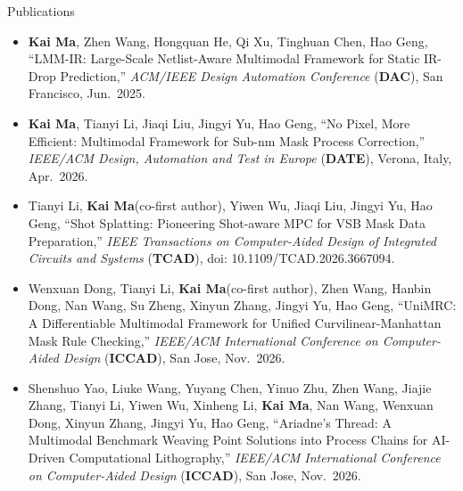 \documentclass{resume}
\begin{document}
\begin{rSection}{Publications}
\vspace{0.3em}

\begin{itemize}[label={}, leftmargin=2.5em, itemsep=0.4em]
  \item[{[\textbf{C1}]}] {\bf Kai Ma}, Zhen Wang, Hongquan He, Qi Xu, Tinghuan Chen, Hao Geng,
    ``LMM-IR: Large-Scale Netlist-Aware Multimodal Framework for Static IR-Drop Prediction,''
    \textit{ACM/IEEE Design Automation Conference} ({\bf DAC}), San Francisco, Jun.\ 2025.
  \item[{[\textbf{C2}]}] {\bf Kai Ma}, Tianyi Li, Jiaqi Liu, Jingyi Yu, Hao Geng,
    ``No Pixel, More Efficient: Multimodal Framework for Sub-nm Mask Process Correction,''
    \textit{IEEE/ACM Design, Automation and Test in Europe} ({\bf DATE}), Verona, Italy, Apr.\ 2026.
\end{itemize}

\vspace{0.15em}

\begin{itemize}[label={}, leftmargin=2.5em, itemsep=0.4em]
  \item[{[\textbf{J1}]}] Tianyi Li, {\bf Kai Ma}(co-first author), Yiwen Wu, Jiaqi Liu, Jingyi Yu, Hao Geng,
    ``Shot Splatting: Pioneering Shot-aware MPC for VSB Mask Data Preparation,''
    \textit{IEEE Transactions on Computer-Aided Design of Integrated Circuits and Systems}
    ({\bf TCAD}), doi: 10.1109/TCAD.2026.3667094.
\end{itemize}

\vspace{0.15em}

\begin{itemize}[label={}, leftmargin=2.5em, itemsep=0.4em]
  \item[{[\textbf{C3}]}] Wenxuan Dong, Tianyi Li, {\bf Kai Ma}(co-first author), Zhen Wang, Hanbin Dong, Nan Wang, Su Zheng, Xinyun Zhang, Jingyi Yu, Hao Geng,
    ``UniMRC: A Differentiable Multimodal Framework for Unified Curvilinear-Manhattan Mask Rule Checking,''
    \textit{IEEE/ACM International Conference on Computer-Aided Design} ({\bf ICCAD}), San Jose, Nov.\ 2026.

  \vspace{0.15em}

  \item[{[\textbf{C4}]}] Shenshuo Yao, Liuke Wang, Yuyang Chen, Yinuo Zhu, Zhen Wang, Jiajie Zhang, Tianyi Li, Yiwen Wu, Xinheng Li, {\bf Kai Ma}, Nan Wang, Wenxuan Dong, Xinyun Zhang, Jingyi Yu, Hao Geng,
    ``Ariadne's Thread: A Multimodal Benchmark Weaving Point Solutions into Process Chains for AI-Driven Computational Lithography,''
    \textit{IEEE/ACM International Conference on Computer-Aided Design} ({\bf ICCAD}), San Jose, Nov.\ 2026.
\end{itemize}

\end{rSection}
\end{document}
